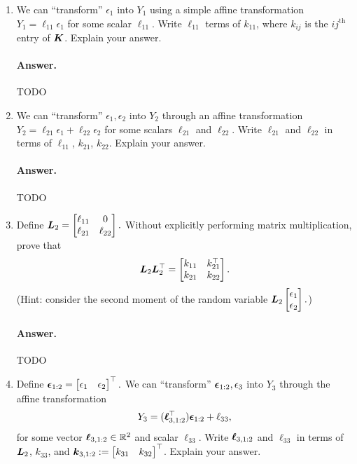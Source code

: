 \documentclass[11pt,letterpaper]{article}
\newenvironment{answer}{%
    \vspace{1em}
    \color{black}
    \paragraph{Answer.}
  }{%
    \vspace{1em}
  }
\begin{document}
\begin{enumerate}
  \item
    We can ``transform'' $\epsilon_1$ into $Y_1$ using a simple affine transformation $Y_1 = \ell_{11} \epsilon_1$
    for some scalar $\ell_{11}$.
    Write $\ell_{11}$ terms of $k_{11}$, where $k_{ij}$ is the $ij^\mathrm{th}$ entry of ${\bm{K}}$.
    Explain your answer.

\begin{answer}
  TODO
\end{answer}

  \item We can ``transform'' $\epsilon_1, \epsilon_2$ into $Y_2$ through an affine transformation $Y_2 = \ell_{21} \epsilon_1 + \ell_{22} \epsilon_2$
    for some scalars $\ell_{21}$ and $\ell_{22}$.
    Write $\ell_{21}$ and $\ell_{22}$ in terms of $\ell_{11}$, $k_{21}$, $k_{22}$.
    Explain your answer.

\begin{answer}
  TODO
\end{answer}

  \item Define ${\bm{L}}_2 = \begin{bmatrix} \ell_{11} & 0 \\ \ell_{21} & \ell_{22} \end{bmatrix}.$
    Without explicitly performing matrix multiplication, prove that
    $${\bm{L}}_2 {\bm{L}}_2^\top = \begin{bmatrix} k_{11} & k_{21}^\top \\ k_{21} & k_{22} \end{bmatrix}.$$
    (Hint: consider the second moment of the random variable ${\bm{L}}_2 \begin{bmatrix} \epsilon_1 \\ \epsilon_2 \end{bmatrix}.$)

\begin{answer}
  TODO
\end{answer}

  \item
    Define ${\bm{\epsilon}}_{1:2} = \begin{bmatrix} \epsilon_1 & \epsilon_2 \end{bmatrix}^\top.$
    We can ``transform'' ${\bm{\epsilon}}_{1:2}, \epsilon_3$ into $Y_3$ through the affine transformation
    $$Y_3 = ({\bm{\ell}}_{3,1:2}^\top) {\bm{\epsilon}}_{1:2} + \ell_{33},$$
    for some vector ${\bm{\ell}}_{3,1:2} \in \mathbb{R}^2$ and scalar $\ell_{33}$.
    Write ${\bm{\ell}}_{3,1:2}$ and $\ell_{33}$ in terms of ${\bm{L}}_{2}$, $k_{33}$, and ${\bm{k}}_{3,1:2} := \begin{bmatrix} k_{31} & k_{32} \end{bmatrix}^\top$.
    Explain your answer.


\end{enumerate}
\end{document}
